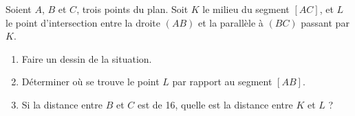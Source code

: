 
\begin{exercice}\label{exoSeconde-0082}

    Soient \( A\), \( B\) et \( C\), trois points du plan. Soit \( K\) le milieu du segment \( [AC]\), et \( L\) le point d'intersection entre la droite \( (AB)\) et la parallèle à \( (BC)\) passant par \( K\).
    \begin{enumerate}
        \item
            Faire un dessin de la situation.
        \item
            Déterminer où se trouve le point \( L\) par rapport au segment \( [AB]\).
        \item
            Si la distance entre \( B\) et \( C\) est de \unit{16}{\centi\meter}, quelle est la distance entre \( K\) et \( L\) ?
    \end{enumerate}

\end{exercice}
